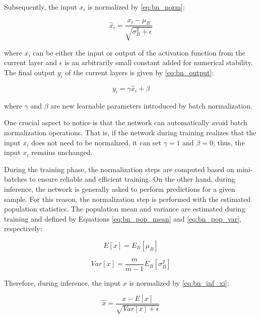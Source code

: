 Subsequently, the input $x_i$ is normalized by \autoref{eq:bn_norm}:

\begin{equation}
\label{eq:bn_norm}
\hat{x}_i = \frac{x_i - \mu_B}{\sqrt{\sigma_B^{2} + \epsilon}}
\end{equation}

\noindent
where $x_i$ can be either the input or output of the activation function from the current layer and $\epsilon$ is an arbitrarily small constant added for numerical stability. The final output $y_i$ of the current layers is given by \autoref{eq:bn_output}:

\begin{equation}
\label{eq:bn_output}
y_i = \gamma\hat{x}_i + \beta
\end{equation}

\noindent
where $\gamma$ and $\beta$ are new learnable parameters introduced by batch normalization. 

One crucial aspect to notice is that the network can automatically avoid batch normalization operations. That is, if the network during training realizes that the input $x_i$ does not need to be normalized, it can set $\gamma=1$ and $\beta=0$; thus, the input $x_i$ remains unchanged.

During the training phase, the normalization steps are computed based on mini-batches to ensure reliable and efficient training. On the other hand, during inference, the network is generally asked to perform predictions for a given sample. For this reason, the normalization step is performed with the estimated population statistics. The population mean and variance are estimated during training and defined by Equations \ref{eq:bn_pop_mean} and \ref{eq:bn_pop_var}, respectively: 

\begin{equation}
\label{eq:bn_pop_mean}
E[x] = E_B[\mu_B]
\end{equation}

\begin{equation}
\label{eq:bn_pop_var}
Var[x] = \frac{m}{m-1} E_B[\sigma_B^{2}]
\end{equation}

Therefore, during inference, the input $x$ is normalized by \autoref{eq:bn_inf_xi}:

\begin{equation}
\label{eq:bn_inf_xi}
\hat{x} = \frac{x - E[x]}{\sqrt{Var[x] + \epsilon}}
\end{equation}

